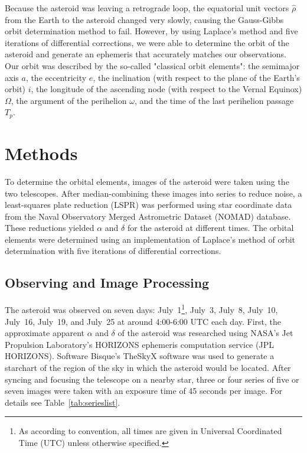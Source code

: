 \documentclass[11pt,a4paper]{article}
\begin{document}
Because the asteroid was leaving a retrograde loop, the equatorial unit vectors $\hat{\rho}$ from the Earth to the asteroid changed very slowly, causing the Gauss-Gibbs orbit determination method to fail.
However, by using Laplace's method and five iterations of differential corrections, we were able to determine the orbit of the asteroid and generate an ephemeris that accurately matches our observations.
Our orbit was described by the so-called "classical orbit elements": the semimajor axis $a$, the eccentricity $e$, the inclination (with respect to the plane of the Earth's orbit) $i$, the longitude of the ascending node (with respect to the Vernal Equinox) $\Omega$, the argument of the perihelion $\omega$, and the time of the last perihelion passage $T_p$.

\section{Methods}

To determine the orbital elements, images of the asteroid were taken using the two telescopes.
After median-combining these images into series to reduce noise, a least-squares plate reduction (LSPR) was performed using star coordinate data from the Naval Observatory Merged Astrometric Dataset (NOMAD) database. These reductions yielded $\alpha$ and $\delta$ for the asteroid at different times.
The orbital elements were determined using an implementation of Laplace's method of orbit determination with five iterations of differential corrections.

\subsection{Observing and Image Processing}
The asteroid was observed on seven days: July~1\footnote{As according to convention, all times are given in Universal Coordinated Time (UTC) unless otherwise specified.}, July~3, July~8, July~10, July~16, July~19, and July~25 at around 4:00-6:00 UTC each day.
First, the approximate apparent $\alpha$ and $\delta$ of the asteroid was researched using NASA's Jet Propulsion Laboratory's HORIZONS ephemeris computation service (JPL HORIZONS).
Software Bisque's TheSkyX software was used to generate a starchart of the region of the sky in which the asteroid would be located.
After syncing and focusing the telescope on a nearby star, three or four series of five or seven images were taken with an exposure time of 45 seconds per image. For details see Table~\ref{tab:serieslist}. 
\end{document}
